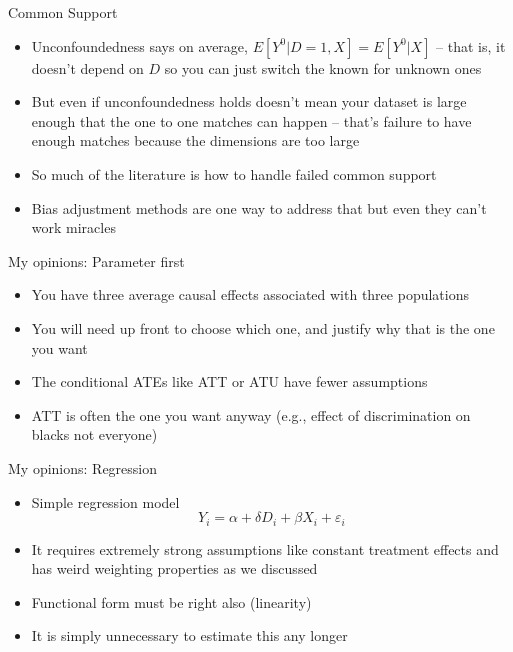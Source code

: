\documentclass{beamer}
\begin{document}
\begin{frame}{Common Support}

\begin{itemize}
\item Unconfoundedness says on average, $E[Y^0|D=1,X]=E[Y^0|X]$ -- that is, it doesn't depend on $D$ so you can just switch the known for unknown ones
\item But even if unconfoundedness holds doesn't mean your dataset is large enough that the one to one matches can happen -- that's failure to have enough matches because the dimensions are too large
\item So much of the literature is how to handle failed common support
\item Bias adjustment methods are one way to address that but even they can't work miracles
\end{itemize}

\end{frame}





\begin{frame}{My opinions: Parameter first}

\begin{itemize}

\item You have three average causal effects associated with three populations
\item You will need up front to choose which one, and justify why that is the one you want
\item The conditional ATEs like ATT or ATU have fewer assumptions
\item ATT is often the one you want anyway (e.g., effect of discrimination on blacks not everyone)
\end{itemize}

\end{frame}

\begin{frame}{My opinions: Regression}

\begin{itemize}
\item Simple regression model $$Y_i = \alpha + \delta D_i + \beta X_i +\varepsilon_i$$
\item It requires extremely strong assumptions like constant treatment effects and has weird weighting properties as we discussed
\item Functional form must be right also (linearity)
\item It is simply unnecessary to estimate this any longer
\end{itemize}

\end{frame}
\end{document}

